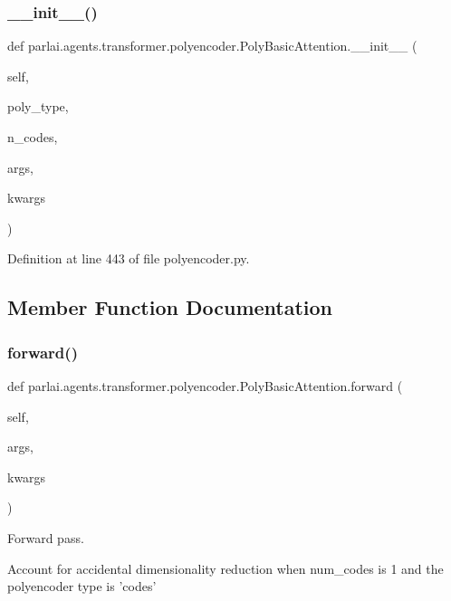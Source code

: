 \subsubsection{\texorpdfstring{\+\_\+\+\_\+init\+\_\+\+\_\+()}{\_\_init\_\_()}}
{\footnotesize\ttfamily def parlai.\+agents.\+transformer.\+polyencoder.\+Poly\+Basic\+Attention.\+\_\+\+\_\+init\+\_\+\+\_\+ (\begin{DoxyParamCaption}\item[{}]{self,  }\item[{}]{poly\+\_\+type,  }\item[{}]{n\+\_\+codes,  }\item[{}]{args,  }\item[{}]{kwargs }\end{DoxyParamCaption})}



Definition at line 443 of file polyencoder.\+py.



\subsection{Member Function Documentation}
\mbox{\label{classparlai_1_1agents_1_1transformer_1_1polyencoder_1_1PolyBasicAttention_a6927374c5336d0111ab936c1fd2b62ff}} 
\subsubsection{\texorpdfstring{forward()}{forward()}}
{\footnotesize\ttfamily def parlai.\+agents.\+transformer.\+polyencoder.\+Poly\+Basic\+Attention.\+forward (\begin{DoxyParamCaption}\item[{}]{self,  }\item[{}]{args,  }\item[{}]{kwargs }\end{DoxyParamCaption})}

\begin{DoxyVerb}Forward pass.

Account for accidental dimensionality reduction when num_codes is 1
and the polyencoder type is 'codes'
\end{DoxyVerb}
 

